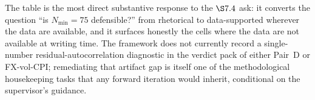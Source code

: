 The table is the most direct substantive response to the
\(\S 7.4\) ask: it converts the question ``is \(N_{\min} = 75\)
defensible?'' from rhetorical to data-supported wherever the
data are available, and it surfaces honestly the cells where the data
are not available at writing time. The framework does not currently
record a single-number residual-autocorrelation diagnostic in the
verdict pack of either Pair~D or FX-vol-CPI; remediating that
artifact gap is itself one of the methodological housekeeping tasks
that any forward iteration would inherit, conditional on the
supervisor's guidance.

